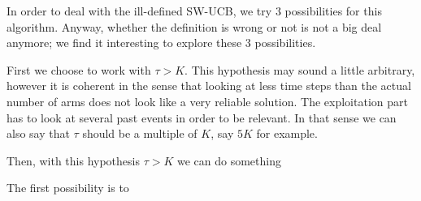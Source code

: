 In order to deal with the ill-defined SW-UCB, we try $3$ possibilities for this algorithm. Anyway, whether the definition is wrong or not is not a big deal anymore; we find it interesting to explore these $3$ possibilities.

First we choose to work with $\tau > K$. This hypothesis may sound a little arbitrary, however it is coherent in the sense that looking at less time steps than the actual number of arms does not look like a very reliable solution. The exploitation part has to look at several past events in order to be relevant. In that sense we can also say that $\tau$ should be a multiple of $K$, say $5K$ for example. 

Then, with this hypothesis $\tau > K$ we can do something

The first possibility is to 